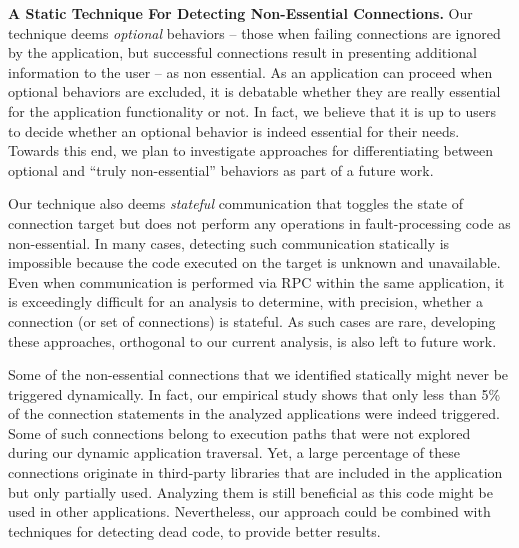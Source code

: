 \vspace{0.05in}
\noindent 
{\bf A Static Technique For Detecting Non-Essential Connections.}
Our technique deems \emph{optional} behaviors -- those when failing connections are ignored by the application, but successful connections result in presenting additional information to the user -- as non essential. 
As an application can proceed when optional behaviors are excluded, it is debatable whether they are really essential for the application functionality or not. 
In fact, we believe that it is up to users to decide whether an optional behavior is indeed essential for their needs. Towards this end, we plan to investigate approaches for differentiating between optional and ``truly non-essential'' behaviors as part of a future work. 

Our technique also deems \emph{stateful} communication that toggles
the state of connection target but does not perform any operations in
fault-processing code as non-essential. In many cases, detecting such
communication statically is impossible because the code executed on
the target is unknown and unavailable.  Even when communication is
performed via RPC within the same application, it is exceedingly
difficult for an analysis to determine, with precision, whether a
connection (or set of connections) is stateful. As such cases are
rare, developing these approaches, orthogonal to our current analysis,
is also left to future work.
 
Some of the non-essential connections that we identified statically might never be triggered dynamically. In fact, our empirical study shows that only less than 5\% of the connection statements in the analyzed applications were indeed triggered.
Some of such connections belong to execution paths that were not explored during our dynamic application traversal.
Yet, a large percentage of these connections originate in  
third-party libraries that are included in the application but only partially used. 
Analyzing them is still beneficial as this code might be used in other applications.
Nevertheless, our approach could be combined with techniques for detecting dead code, to provide better results.
